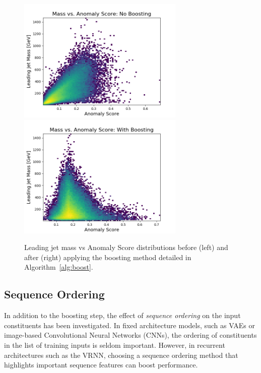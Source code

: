\documentclass[12pt, a4paper]{article}
\begin{document}
\begin{figure}[H]
	\begin{center}
		\includegraphics[width=225pt]{imgs/ProcNoBoostPt_Background_July20_Background_July20_Weights_Leading_ConstOnly_Avg_M_vs_Score_ProcTest_SaveForPaper.png}
		\includegraphics[width=225pt]{imgs/ProcBoostPt_Background_July20_Background_July20_Weights_Leading_ConstOnly_Avg_M_vs_Score_ProcTest_SaveForPaper.png}
	\end{center}
	\caption{Leading jet mass vs Anomaly Score distributions before (left) and after (right) applying the boosting method detailed in Algorithm~\ref{alg:boost}.}
	\label{fig:mass_vs_score_boost}
\end{figure}


\subsection{Sequence Ordering}

In addition to the boosting step, the effect of \textit{sequence ordering} on the input constituents has been investigated. In fixed architecture models, such as VAEs or image-based Convolutional Neural Networks (CNNs), the ordering of constituents in the list of training inputs is seldom important. However, in recurrent architectures such as the VRNN, choosing a sequence ordering method that highlights important sequence features can boost performance.
 
\end{document}
